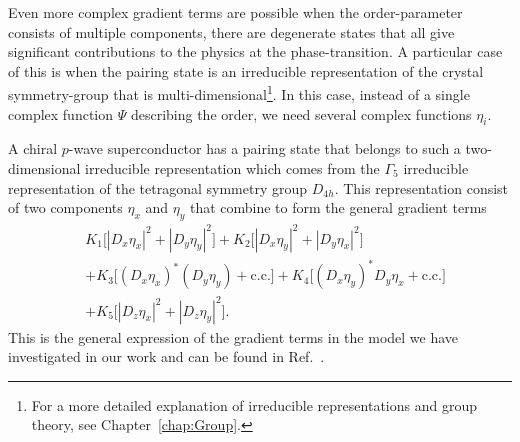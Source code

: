 Even more complex gradient terms are possible when the order-parameter consists of multiple components, \ie there are degenerate
states that all give significant contributions to the physics at the phase-transition. A particular case of this is when the
pairing state is an irreducible representation of the crystal symmetry-group that is multi-dimensional\footnote{For a more detailed explanation
of irreducible representations and group theory, see Chapter~\ref{chap:Group}.}. In this case, instead of a single complex function $\Psi$
describing the order, we need several complex functions $\eta_i$. 

A chiral $p$-wave superconductor has a pairing state that
belongs to such a two-dimensional irreducible representation which comes from the $\Gamma_5$ irreducible representation of the
tetragonal symmetry group $D_{4h}$. This representation consist of two components $\eta_x$ and $\eta_y$ that combine
to form the general gradient terms
\begin{equation}
    \label{eq:statMech:gradTerms:chiralPWave}
    \begin{split}
        &K_1\big[|D_x\eta_x|^2 + |D_y\eta_y|^2\big] + K_2\big[|D_x\eta_y|^2 + |D_y\eta_x|^2\big]\\
        & + K_3\big[(D_x\eta_x)^\ast(D_y\eta_y) + \text{c.c.}\big] + K_4\big[(D_x\eta_y)^\ast D_y\eta_x + \text{c.c.}\big]\\
        & + K_5\big[|D_z\eta_x|^2 + |D_z\eta_y|^2\big].
    \end{split}
\end{equation}
This is the general expression of the gradient terms in the model we have investigated in our work and can be found in Ref.~\cite{SigristUeda91}.
